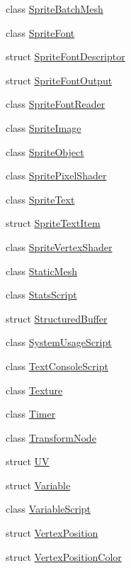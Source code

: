 \begin{DoxyCompactItemize}
class \hyperlink{classmage_1_1_sprite_batch_mesh}{Sprite\+Batch\+Mesh}
\item 
class \hyperlink{classmage_1_1_sprite_font}{Sprite\+Font}
\item 
struct \hyperlink{structmage_1_1_sprite_font_descriptor}{Sprite\+Font\+Descriptor}
\item 
struct \hyperlink{structmage_1_1_sprite_font_output}{Sprite\+Font\+Output}
\item 
class \hyperlink{classmage_1_1_sprite_font_reader}{Sprite\+Font\+Reader}
\item 
class \hyperlink{classmage_1_1_sprite_image}{Sprite\+Image}
\item 
class \hyperlink{classmage_1_1_sprite_object}{Sprite\+Object}
\item 
class \hyperlink{classmage_1_1_sprite_pixel_shader}{Sprite\+Pixel\+Shader}
\item 
class \hyperlink{classmage_1_1_sprite_text}{Sprite\+Text}
\item 
struct \hyperlink{structmage_1_1_sprite_text_item}{Sprite\+Text\+Item}
\item 
class \hyperlink{classmage_1_1_sprite_vertex_shader}{Sprite\+Vertex\+Shader}
\item 
class \hyperlink{classmage_1_1_static_mesh}{Static\+Mesh}
\item 
class \hyperlink{classmage_1_1_stats_script}{Stats\+Script}
\item 
struct \hyperlink{structmage_1_1_structured_buffer}{Structured\+Buffer}
\item 
class \hyperlink{classmage_1_1_system_usage_script}{System\+Usage\+Script}
\item 
class \hyperlink{classmage_1_1_text_console_script}{Text\+Console\+Script}
\item 
class \hyperlink{classmage_1_1_texture}{Texture}
\item 
class \hyperlink{classmage_1_1_timer}{Timer}
\item 
class \hyperlink{classmage_1_1_transform_node}{Transform\+Node}
\item 
struct \hyperlink{structmage_1_1_u_v}{UV}
\item 
struct \hyperlink{structmage_1_1_variable}{Variable}
\item 
class \hyperlink{classmage_1_1_variable_script}{Variable\+Script}
\item 
struct \hyperlink{structmage_1_1_vertex_position}{Vertex\+Position}
\item 
struct \hyperlink{structmage_1_1_vertex_position_color}{Vertex\+Position\+Color}

\end{DoxyCompactItemize}
